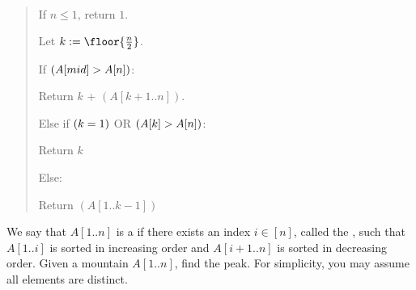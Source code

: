 \documentclass[10pt]{article}
\newcommand{\parof}[1]{\mleft( #1 \mright)}
\begin{document}
\begin{solution}\ %
\begin{quote}%
\noindent{}%


\begin{steps}
  \item If \( n \leq 1 \), return \( 1 \).
  \item Let \( k := \floor{\frac{n}{2}} \).
  \item If \( \parof{A[mid] > A[n]} \):
  \begin{steps}
    \item Return \( k \) + \( (A[k+1..n]) \).
  \end{steps}
  \item Else if \( \parof{k = 1} \) OR \( \parof{A[k] > A[n] } \):
  \begin{steps}
    \item Return \( k \)
  \end{steps}
  \item Else:
  \begin{steps}
    \item Return \( (A[1..k-1]) \)
  \end{steps}
\end{steps}
\end{quote}
\end{solution}
\pagebreak

We say that \( A[1..n] \) is a  if there exists an index \( i \in [n] \), called the
, such that \( A[1..i] \) is sorted in increasing order and \( A[i + 1..n] \) is sorted in
decreasing order. Given a mountain \( A[1..n] \), find the peak. For simplicity, you may assume all
elements are distinct.
\end{document}
